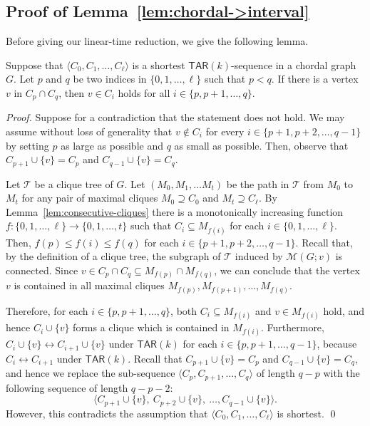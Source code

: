 \documentclass{llncs}
\newcommand{\onestep}{\leftrightarrow}
\newcommand{\TAR}[1]{\mathsf{TAR}(#1)}
\newcommand{\cliq}{C}
\newcommand{\Msetv}[2]{\mathcal{M}(#1; #2)}
\newcounter{one}
\newcounter{two}
\begin{document}
	\subsection{Proof of Lemma~\ref{lem:chordal->interval}}
	Before giving our linear-time reduction, we give the following lemma.

	\begin{lemma} \label{lem:never-appear-again}
	Suppose that $\langle \cliq_{0}, \cliq_1, \ldots, \cliq_{\ell}\rangle$ is a shortest $\TAR{k}$-sequence in a chordal graph $G$.
	Let $p$ and $q$ be two indices in $\{0,1, \ldots, \ell\}$ such that $p < q$.
	If there is a vertex $v$ in $\cliq_{p} \cap \cliq_{q}$, then $v \in \cliq_{i}$ holds for all $i \in \{p, p+1, \ldots, q\}$.
	\end{lemma}
	\begin{proof}
	Suppose for a contradiction that the statement does not hold.
	We may assume without loss of generality that $v \notin \cliq_{i}$ for every $i \in \{p+1, p+2, \ldots, q-1\}$ by setting $p$ as large as possible and $q$ as small as possible.
	Then, observe that $\cliq_{p+1} \cup \{v\} = \cliq_{p}$ and $\cliq_{q-1} \cup \{v\} = \cliq_{q}$.

	Let $\mathcal{T}$ be a clique tree of $G$.
	Let $(M_{0}, M_1, \dots M_{t})$ be the path in $\mathcal{T}$ from $M_{0}$ to $M_{t}$ for any pair of maximal cliques $M_{0} \supseteq \cliq_0$ and $M_{t} \supseteq \cliq_{\ell}$.
	By Lemma~\ref{lem:consecutive-cliques} there is a monotonically increasing function $f \colon \{0,1,\dots,\ell\} \to \{0, 1,\dots, t\}$ such that $C_{i} \subseteq M_{f(i)}$ for each $i \in \{0,1,\ldots,\ell\}$.
	Then, $f(p) \le f(i) \le f(q)$ for each $i \in \{p+1, p+2, \ldots, q-1\}$.
	Recall that, by the definition of a clique tree, the subgraph of $\mathcal{T}$ induced by $\Msetv{G}{v}$ is connected.
	Since $v \in \cliq_{p} \cap \cliq_{q} \subseteq M_{f(p)} \cap M_{f(q)}$, we can conclude that the vertex $v$ is contained in all maximal cliques $M_{f(p)}, M_{f(p+1)}, \ldots, M_{f(q)}$.

	Therefore, for each $i \in \{p, p+1, \ldots, q\}$, both $\cliq_i \subseteq M_{f(i)}$ and $v \in M_{f(i)}$ hold, and hence $\cliq_i \cup \{v\}$ forms a clique which is contained in $M_{f(i)}$.
	Furthermore, $\cliq_{i} \cup \{v\} \onestep \cliq_{i+1} \cup \{v\}$ under $\TAR{k}$ for each $i \in \{p, p+1, \ldots, q-1\}$, because $\cliq_{i} \onestep \cliq_{i+1}$ under $\TAR{k}$.
	Recall that $\cliq_{p+1} \cup \{v\} = \cliq_{p}$ and $\cliq_{q-1} \cup \{v\} = \cliq_{q}$, and hence we replace the sub-sequence $\langle \cliq_{p}, \cliq_{p+1}, \ldots, \cliq_{q} \rangle$ of length $q-p$ with the following sequence of length $q-p-2$:
	\[
		\langle \cliq_{p+1} \cup \{v\},\ \cliq_{p+2} \cup \{v\},\ \ldots, \cliq_{q-1} \cup \{v\} \rangle. 
	\]
	However, this contradicts the assumption that $\langle \cliq_{0}, \cliq_1, \ldots, \cliq_{\ell}\rangle$ is shortest.
	\qed
\end{proof}
\medskip
\end{document}
